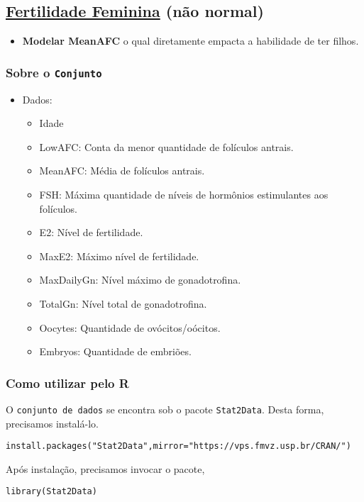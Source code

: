 \documentclass[11pt]{article}
\begin{document}
\subsection{\href{https://r-data.pmagunia.com/dataset/r-dataset-package-stat2data-fertility}{Fertilidade Feminina} (não normal)}
\label{sec:orgba768f9}
\begin{itemize}
\item \textbf{Modelar MeanAFC} o qual diretamente empacta a habilidade de ter filhos.
\end{itemize}
\subsubsection{Sobre o \texttt{Conjunto}}
\label{sec:orgcc096bb}
\begin{itemize}
\item Dados:
\begin{itemize}
\item Idade
\item LowAFC: Conta da menor quantidade de folículos antrais.
\item MeanAFC: Média de folículos antrais.
\item FSH: Máxima quantidade de níveis de hormônios estimulantes aos folículos.
\item E2: Nível de fertilidade.
\item MaxE2: Máximo nível de fertilidade.
\item MaxDailyGn: Nível máximo de gonadotrofina.
\item TotalGn: Nível total de gonadotrofina.
\item Oocytes: Quantidade de ovócitos/oócitos.
\item Embryos: Quantidade de embriões.
\end{itemize}
\end{itemize}
\subsubsection{Como utilizar pelo R}
\label{sec:orge76817f}
O \texttt{conjunto de dados} se encontra sob o pacote \texttt{Stat2Data}. Desta forma, precisamos
instalá-lo.

\begin{verbatim}
install.packages("Stat2Data",mirror="https://vps.fmvz.usp.br/CRAN/")
\end{verbatim}

Após instalação, precisamos invocar o pacote,
\begin{verbatim}
library(Stat2Data)
\end{verbatim}
\end{document}

